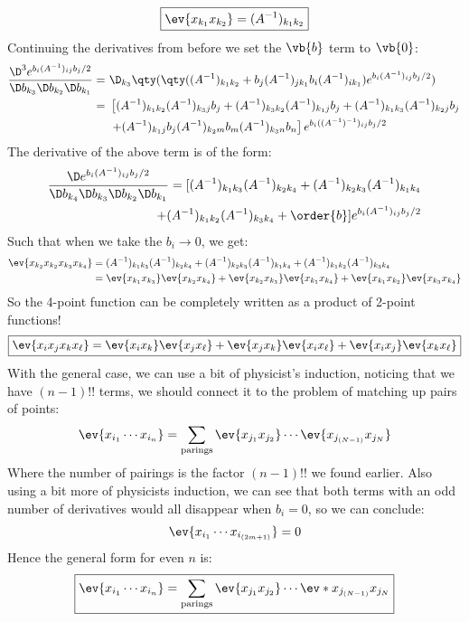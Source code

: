 \documentclass[12pt]{article}
\begin{document}
\begin{align}
  \boxed{\ev{x_{k_1}x_{k_2}}=(A^{-1})_{k_1k_2}}
\end{align}
Continuing the derivatives from before we set the $\vb{b}$ term to $\vb{0}$:
\begin{align*}
  \frac{\D^3e^{b_i(A^{-1})_{ij}b_j/2}}{\D b_{k_3}\D b_{k_2}\D b_{k_1}}
  =&\ \D_{k_3}\qty(\qty((A^{-1})_{k_1k_2}+b_{j}(A^{-1})_{jk_1}b_{i}(A^{-1})_{ik_1})e^{b_i(A^{-1})_{ij}b_j/2})\\
  =&\ \left[(A^{-1})_{k_1k_2}(A^{-1})_{k_3j}b_j+(A^{-1})_{k_3k_2}(A^{-1})_{k_1j}b_j+(A^{-1})_{k_1k_3}(A^{-1})_{k_2j}b_j\right.\\
  &\ \left.+(A^{-1})_{k_1j}b_j(A^{-1})_{k_2m}b_m(A^{-1})_{k_3n}b_n\right]e^{b_i((A^{-1})^{-1})_{ij}b_j/2}
\end{align*}
The derivative of the above term is of the form:
\begin{align*}
  \frac{\D e^{b_i(A^{-1})_{ij}b_j/2}}{\D b_{k_4}\D b_{k_3}\D b_{k_2}\D b_{k_1}}=
  [(A^{-1})_{k_1k_3}(A^{-1})_{k_2k_4}+(A^{-1})_{k_2k_3}(A^{-1})_{k_1k_4}
  \\+(A^{-1})_{k_1k_2}(A^{-1})_{k_3k_4}
  +\order{b}]e^{b_i(A^{-1})_{ij}b_j/2}
\end{align*}
Such that when we take the $b_i\to0$, we get:
\begin{align*}
  \ev{x_{k_2}x_{k_2}x_{k_3}x_{k_4}}
  &=(A^{-1})_{k_1k_3}(A^{-1})_{k_2k_4}
  +(A^{-1})_{k_2k_3}(A^{-1})_{k_1k_4}
  +(A^{-1})_{k_1k_2}(A^{-1})_{k_3k_4}\\
  &=\ev{x_{k_1}x_{k_3}}\ev{x_{k_2}x_{k_4}}
  +\ev{x_{k_2}x_{k_3}}\ev{x_{k_1}x_{k_4}}
  +\ev{x_{k_1}x_{k_2}}\ev{x_{k_3}x_{k_4}}
\end{align*}
So the 4-point function can be completely written as a product of 2-point functions!
\begin{align}
  \boxed{\ev{x_{i}x_{j}x_{k}x_{\ell}}
    =\ev{x_{i}x_{k}}\ev{x_{j}x_{\ell}}
    +\ev{x_{j}x_{k}}\ev{x_{i}x_{\ell}}
    +\ev{x_{i}x_{j}}\ev{x_{k}x_{\ell}}}
\end{align}
With the general case, we can use a bit of physicist's induction, noticing that we have $(n-1)!!$ terms, we should connect it to the problem of matching up pairs of points:
\begin{align*}
  \ev{x_{i_1}\cdots x_{i_n}}=\sum_{\text{parings}}\ev{x_{j_1}x_{j_2}}\cdots\ev{x_{j_{(N-1)}}x_{j_N}}
\end{align*}
Where the number of pairings is the factor $(n-1)!!$ we found earlier. Also using a bit more of physicists induction, we can see that both terms with an odd number of derivatives would all disappear when $b_i=0$, so we can conclude:
\begin{align*}
  \ev{x_{i_1}\cdots x_{i_{(2m+1)}}}=0
\end{align*}
Hence the general form for even $n$ is:
\begin{align}
  \boxed{\ev{x_{i_1}\cdots x_{i_n}}=\sum_{\text{parings}}\ev{x_{j_1}x_{j_2}}\cdots\ev*{x_{j_{(N-1)}}x_{j_N}}}
\end{align}
\newpage
\end{document}
